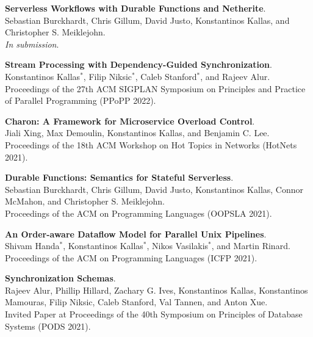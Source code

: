 \begin{minipage}{\textwidth}
\textbf{Serverless Workflows with Durable Functions and Netherite}. \\
Sebastian Burckhardt, Chris Gillum, David Justo, Konstantinos Kallas, and Christopher S. Meiklejohn. \\
\emph{In submission}.
\end{minipage}

\begin{minipage}{\textwidth}
\textbf{Stream Processing with Dependency-Guided Synchronization}. \\
Konstantinos Kallas$^*$, Filip Niksic$^*$, Caleb Stanford$^*$, and Rajeev Alur. \\
Proceedings of the 27th ACM SIGPLAN Symposium on Principles and Practice of Parallel Programming (PPoPP 2022).
\end{minipage}

\begin{minipage}{\textwidth}
\textbf{Charon: A Framework for Microservice Overload Control}. \\
Jiali Xing, Max Demoulin, Konstantinos Kallas, and Benjamin C. Lee. \\
Proceedings of the 18th ACM Workshop on Hot Topics in Networks (HotNets 2021).
\end{minipage}

\begin{minipage}{\textwidth}
\textbf{Durable Functions: Semantics for Stateful Serverless}. \\
Sebastian Burckhardt, Chris Gillum, David Justo, Konstantinos Kallas, Connor McMahon, and Christopher S. Meiklejohn. \\
Proceedings of the ACM on Programming Languages (OOPSLA 2021).
\end{minipage}

\begin{minipage}{\textwidth}
\textbf{An Order-aware Dataflow Model for Parallel Unix Pipelines}. \\
Shivam Handa$^*$, Konstantinos Kallas$^*$, Nikos Vasilakis$^*$, and Martin Rinard. \\
Proceedings of the ACM on Programming Languages (ICFP 2021).
\end{minipage}

\begin{minipage}{\textwidth}
\textbf{Synchronization Schemas}. \\
Rajeev Alur, Phillip Hillard, Zachary G. Ives, Konstantinos Kallas, Konstantinos Mamouras, Filip Niksic, Caleb Stanford, Val Tannen, and Anton Xue. \\
Invited Paper at Proceedings of the 40th Symposium on Principles of Database Systems (PODS 2021).
\end{minipage}

